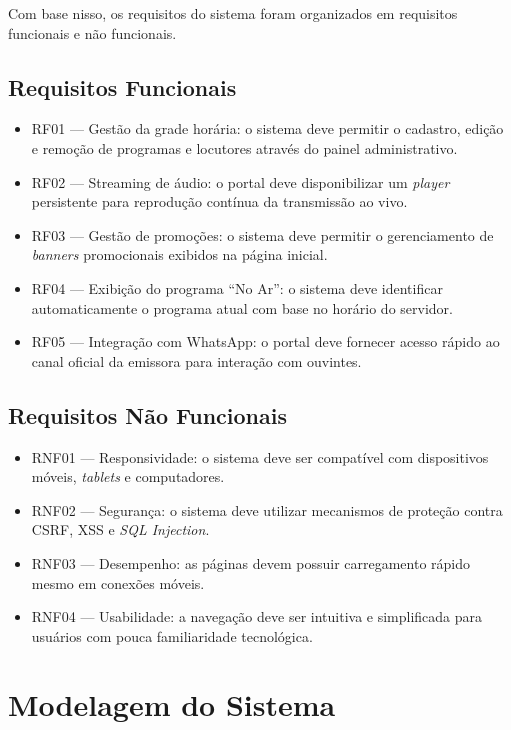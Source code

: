\documentclass[12pt, openright, oneside, a4paper, brazil]{ads-unipac-abntex2}
\begin{document}
Com base nisso, os requisitos do sistema foram organizados em requisitos funcionais e não funcionais.

\subsection{Requisitos Funcionais}

\begin{itemize}
    \item RF01 — Gestão da grade horária: o sistema deve permitir o cadastro, edição e remoção de programas e locutores através do painel administrativo.
    \item RF02 — Streaming de áudio: o portal deve disponibilizar um \textit{player} persistente para reprodução contínua da transmissão ao vivo.
    \item RF03 — Gestão de promoções: o sistema deve permitir o gerenciamento de \textit{banners} promocionais exibidos na página inicial.
    \item RF04 — Exibição do programa ``No Ar'': o sistema deve identificar automaticamente o programa atual com base no horário do servidor.
    \item RF05 — Integração com WhatsApp: o portal deve fornecer acesso rápido ao canal oficial da emissora para interação com ouvintes.
\end{itemize}

\subsection{Requisitos Não Funcionais}

\begin{itemize}
    \item RNF01 — Responsividade: o sistema deve ser compatível com dispositivos móveis, \textit{tablets} e computadores.
    \item RNF02 — Segurança: o sistema deve utilizar mecanismos de proteção contra CSRF, XSS e \textit{SQL Injection}.
    \item RNF03 — Desempenho: as páginas devem possuir carregamento rápido mesmo em conexões móveis.
    \item RNF04 — Usabilidade: a navegação deve ser intuitiva e simplificada para usuários com pouca familiaridade tecnológica.
\end{itemize}

\section{Modelagem do Sistema}
\end{document}
